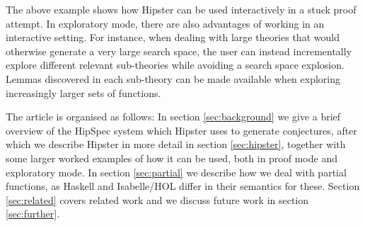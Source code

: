 The above example shows how Hipster can be used interactively in a stuck proof attempt. In exploratory mode, there are also advantages of working in an interactive setting. For instance, when dealing with large theories that would otherwise generate a very large search space, the user can instead incrementally explore different relevant sub-theories while avoiding a search space explosion. Lemmas discovered in each sub-theory can be made available when exploring increasingly larger sets of functions. 

The article is organised as follows: In section \ref{sec:background} we give a brief overview of the HipSpec system which Hipster uses to generate conjectures, after which we describe Hipster in more detail in section \ref{sec:hipster}, together with some larger worked examples of how it can be used, both in proof mode and exploratory mode. In section \ref{sec:partial} we describe how we deal with partial functions, as Haskell and Isabelle/HOL differ in their semantics for these. Section \ref{sec:related} covers related work and we discuss future work in section \ref{sec:further}.
